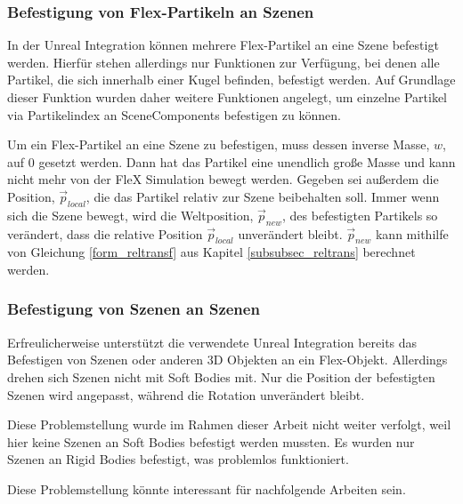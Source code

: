 \subsubsection{Befestigung von Flex-Partikeln an Szenen}

In der Unreal Integration können mehrere Flex-Partikel an eine Szene befestigt werden. Hierfür stehen allerdings nur Funktionen zur Verfügung, bei denen alle Partikel, die sich innerhalb einer Kugel befinden, befestigt werden. Auf Grundlage dieser Funktion wurden daher weitere Funktionen angelegt, um einzelne Partikel via Partikelindex an SceneComponents befestigen zu können.

Um ein Flex-Partikel an eine Szene zu befestigen, muss dessen inverse Masse, $w$, auf 0 gesetzt werden. Dann hat das Partikel eine unendlich große Masse und kann nicht mehr von der FleX Simulation bewegt werden. 
Gegeben sei außerdem die Position, $\vec{p}_{local}$, die das Partikel relativ zur Szene beibehalten soll. Immer wenn sich die Szene bewegt, wird die Weltposition, $\vec{p}_{new}$, des befestigten Partikels so verändert, dass die relative Position $\vec{p}_{local}$ unverändert bleibt.
$\vec{p}_{new}$ kann mithilfe von Gleichung \ref{form_reltransf} aus Kapitel \ref{subsubsec_reltrans} berechnet werden.




\subsubsection{Befestigung von Szenen an Szenen}

Erfreulicherweise unterstützt die verwendete Unreal Integration bereits das Befestigen von Szenen oder anderen 3D Objekten an ein Flex-Objekt. Allerdings drehen sich Szenen nicht mit Soft Bodies mit. Nur die Position der befestigten Szenen wird angepasst, während die Rotation unverändert bleibt. 

Diese Problemstellung wurde im Rahmen dieser Arbeit nicht weiter verfolgt, weil hier keine Szenen an Soft Bodies befestigt werden mussten. Es wurden nur Szenen an Rigid Bodies befestigt, was problemlos funktioniert.

Diese Problemstellung könnte interessant für nachfolgende Arbeiten sein.

